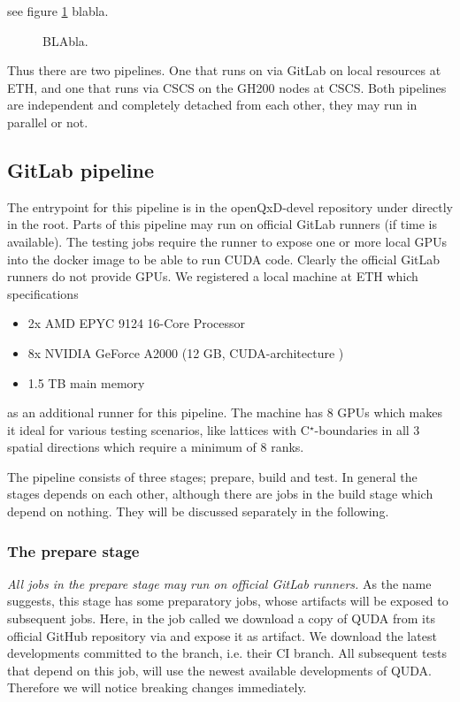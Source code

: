 see figure \cref{fig:external} blabla.

\begin{figure}
    \centering
    
    \caption{BLAbla.}
    \label{fig:external}
\end{figure}

Thus there are two pipelines. One that runs on via GitLab on local resources at ETH, and one that runs via CSCS on the GH200 nodes at CSCS. Both pipelines are independent and completely detached from each other, they may run in parallel or not.

\subsection{GitLab pipeline}
\label{sec:cicd:pipeline:gitlab}

The entrypoint for this pipeline is in the openQxD-devel repository\cite{gitlab:openqxd-devel} under  directly in the root. Parts of this pipeline may run on official GitLab runners (if time is available). The testing jobs require the runner to expose one or more local GPUs into the docker image to be able to run CUDA code. Clearly the official GitLab runners do not provide GPUs. We registered a local machine at ETH which specifications
\begin{itemize}
    \item 2x AMD EPYC 9124 16-Core Processor
    \item 8x NVIDIA GeForce A2000 (12 GB, CUDA-architecture )
    \item 1.5 TB main memory
\end{itemize}
as an additional runner for this pipeline. The machine has 8 GPUs which makes it ideal for various testing scenarios, like lattices with C$^\star$-boundaries in all $3$ spatial directions which require a minimum of 8 ranks.

The pipeline consists of three stages; prepare, build and test. In general the stages depends on each other, although there are jobs in the build stage which depend on nothing. They will be discussed separately in the following.

\subsubsection{The prepare stage}

\emph{All jobs in the prepare stage may run on official GitLab runners.} As the name suggests, this stage has some preparatory jobs, whose artifacts will be exposed to subsequent jobs. Here, in the job called  we download a copy of QUDA from its official GitHub repository \cite{github:quda} via  and expose it as artifact. We download the latest developments committed to the  branch, i.e. their CI branch. All subsequent tests that depend on this job, will use the newest available developments of QUDA. Therefore we will notice breaking changes immediately.


